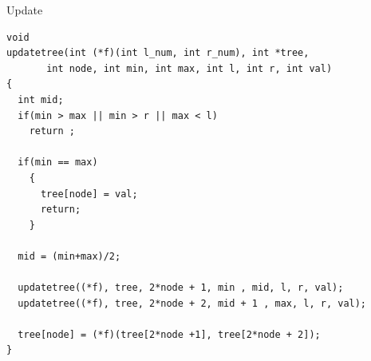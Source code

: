 \documentclass[presentation,9pt]{beamer}
\begin{document}
\begin{frame}[fragile,label={sec:org2917607}]{Update}
 \begin{verbatim}
void
updatetree(int (*f)(int l_num, int r_num), int *tree,
	   int node, int min, int max, int l, int r, int val)
{
  int mid;
  if(min > max || min > r || max < l)
    return ;
  
  if(min == max)
    {
      tree[node] = val;
      return;
    }
  
  mid = (min+max)/2;
      
  updatetree((*f), tree, 2*node + 1, min , mid, l, r, val);
  updatetree((*f), tree, 2*node + 2, mid + 1 , max, l, r, val);
  
  tree[node] = (*f)(tree[2*node +1], tree[2*node + 2]);
}
\end{verbatim}
\end{frame}
\end{document}
